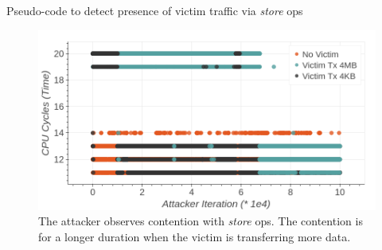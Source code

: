 \begin{minipage}{\textwidth}
    
    \captionsetup{type=lstlisting}
    \caption{Pseudo-code to detect presence of victim traffic via \textit{store} ops}
    \label{lst:timing-victim-with-stores}
\end{minipage}

\begin{figure}[!htb]
    \centering
    \includegraphics[width=0.8\columnwidth]{figures/interconnect-sc/store-ops/cpu_store_victim_observation.png}
    \caption{The attacker observes contention with \textit{store} ops. 
    The contention is for a longer duration when the victim is transferring more data.}
    \label{fig:cpu-store-victim-observation}
\end{figure}
